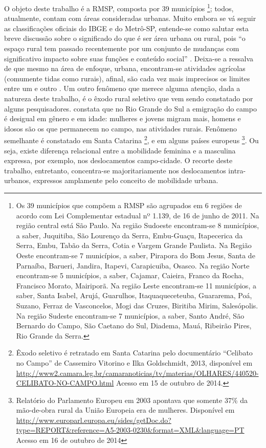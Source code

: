 O objeto deste trabalho é a RMSP, composta por 39 municípios%
\footnote{Os 39 municípios que compõem a RMSP são agrupados em 6 regiões de acordo com Lei Complementar estadual nº 1.139, de 16 de junho de 2011. Na região central está São Paulo. Na região Sudoeste encontram-se 8 municípios, a saber, Juquitiba, São Lourenço da Serra, Embu-Guaçu, Itapecerica da Serra, Embu, Tabão da Serra, Cotia e Vargem Grande Paulista. Na Região Oeste encontram-se 7 municípios, a saber, Pirapora do Bom Jesus, Santa de Parnaíba, Barueri, Jandira, Itapevi, Carapicuiba, Osasco. Na região Norte encontram-se 5 municípios, a saber, Cajamar, Caieira, Franco da Rocha, Francisco Morato, Mairiporã. Na região Leste encontram-se 11 municípios, a saber, Santa Isabel, Arujá, Guarulhos, Itaquaqueceteuba, Guararema, Poá, Suzano, Ferraz de Vasconcelos, Mogi das Cruzes, Biritiba Mirim, Salesópolis. Na região Sudeste encontram-se 7 municípios, a saber, Santo André, São Bernardo do Campo, São Caetano do Sul, Diadema, Mauá, Ribeirão Pires, Rio Grande da Serra.}; todos, atualmente, contam com áreas consideradas urbanas. 
Muito embora se vá seguir as classificações oficiais do IBGE e do Metrô-SP, entende-se como salutar esta breve discussão sobre o significado do que é ser área urbana ou rural, pois ``o espaço rural tem passado recentemente por um conjunto de mudanças com significativo impacto sobre suas funções e conteúdo social'' \cite[p.96]{MARQUES2002}. Deixa-se a ressalva de que mesmo na área de enfoque, urbana, encontram-se atividades agrícolas (comumente tidas como rurais), afinal, são cada vez mais imprecisos os limites entre um e outro \cite{MINGIONE1987}. Um outro fenômeno que merece alguma atenção, dada a natureza deste trabalho, é o êxodo rural seletivo que vem sendo constatado por alguns pesquisadores. \cite{RAUBER2010} constata que no Rio Grande do Sul a emigração do campo é desigual em gênero e em idade: mulheres e jovens migram mais, homens e idosos são os que permanecem no campo, nas atividades rurais. Fenômeno semelhante é constatado em Santa Catarina%
\footnote{Êxodo seletivo é retratado em Santa Catarina pelo documentário ``Celibato no Campo'' de Cassemiro Vitorino e Ilka Goldschmidt, 2013, disponível em \url{http://www2.camara.leg.br/camaranoticias/tv/materias/OLHARES/440520-CELIBATO-NO-CAMPO.html} Acesso em 15 de outubro de 2014.},
e em alguns países europeus%
\footnote{Relatório do Parlamento Europeu em 2003 apontava que somente 37\% da mão-de-obra rural da União Europeia era de mulheres. Disponível em \url{http://www.europarl.europa.eu/sides/getDoc.do?type=REPORT&reference=A5-2003-0230&format=XML&language=PT} Acesso em  16 de outubro de 2014}. Ou seja, existe diferença relacional entre a mobilidade feminina e a masculina expressa, por exemplo, nos deslocamentos campo-cidade.
O recorte deste trabalho, entretanto, concentra-se majoritariamente nos deslocamentos intra-urbanos, expressos amplamente pelo conceito de mobilidade urbana. 


